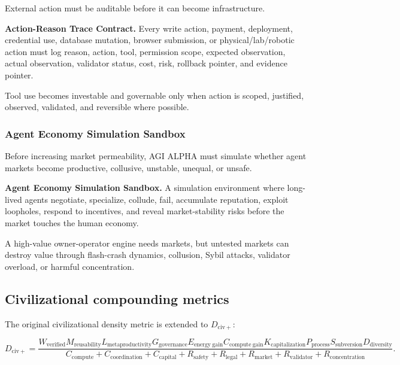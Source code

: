 \documentclass[11pt]{article}
\begin{document}
External action must be auditable before it can become infrastructure.

\textbf{Action-Reason Trace Contract.} Every write action, payment, deployment, credential use, database mutation, browser submission, or physical/lab/robotic action must log reason, action, tool, permission scope, expected observation, actual observation, validator status, cost, risk, rollback pointer, and evidence pointer.

Tool use becomes investable and governable only when action is scoped, justified, observed, validated, and reversible where possible.

\subsubsection{Agent Economy Simulation Sandbox}\label{agent-economy-simulation-sandbox}

Before increasing market permeability, AGI ALPHA must simulate whether agent markets become productive, collusive, unstable, unequal, or unsafe.

\textbf{Agent Economy Simulation Sandbox.} A simulation environment where long-lived agents negotiate, specialize, collude, fail, accumulate reputation, exploit loopholes, respond to incentives, and reveal market-stability risks before the market touches the human economy.

A high-value owner-operator engine needs markets, but untested markets can destroy value through flash-crash dynamics, collusion, Sybil attacks, validator overload, or harmful concentration.

\subsection{Civilizational compounding metrics}\label{civilizational-compounding-metrics}

The original civilizational density metric is extended to \(D_{\mathrm{civ}+}\):

\[
D_{\mathrm{civ}+}
=
\frac{
W_{\mathrm{verified}}
M_{\mathrm{reusability}}
L_{\mathrm{metaproductivity}}
G_{\mathrm{governance}}
E_{\mathrm{energy\ gain}}
C_{\mathrm{compute\ gain}}
K_{\mathrm{capitalization}}
P_{\mathrm{process}}
S_{\mathrm{subversion}}
D_{\mathrm{diversity}}
}{
C_{\mathrm{compute}}
+C_{\mathrm{coordination}}
+C_{\mathrm{capital}}
+R_{\mathrm{safety}}
+R_{\mathrm{legal}}
+R_{\mathrm{market}}
+R_{\mathrm{validator}}
+R_{\mathrm{concentration}}
}.
\]
\end{document}
